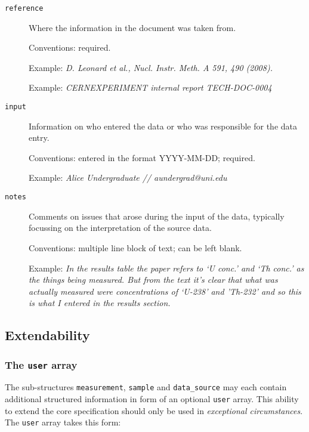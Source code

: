 \documentclass[11pt, letterpaper]{article}
\begin{document}
\begin{description}

  \item[\texttt{reference}] Where the information in the document was taken from.

  Conventions: required.
  
  Example: \textit{D. Leonard et al., Nucl. Instr. Meth. A 591, 490 (2008).}

  Example: \textit{CERNEXPERIMENT internal report TECH-DOC-0004}

  \item[\texttt{input}] Information on who entered the data or who was responsible for the data entry.

  Conventions: entered in the format YYYY-MM-DD; required.
  
  Example: \textit{Alice Undergraduate // aundergrad@uni.edu}     

  \item[\texttt{notes}] Comments on issues that arose during the input of the data, typically focussing on the interpretation of the source data.
  
  Conventions: multiple line block of text; can be left blank.
  
  Example: \textit{In the results table the paper refers to `U conc.' and `Th conc.' as the things being measured. But from the text it's clear that what was actually measured were concentrations of `U-238' and 'Th-232' and so this is what I entered in the results section.}
  
\end{description}

\newpage

\subsection{Extendability} %
\label{sec:opt}

\subsubsection{The \texttt{user} array}

The sub-structures \texttt{measurement}, \texttt{sample} and \texttt{data\_source} may each contain additional structured information in form of an optional \texttt{user} array. This ability to extend the core specification should only be used in \textit{exceptional circumstances}. The \texttt{user} array takes this form:
\end{document}
